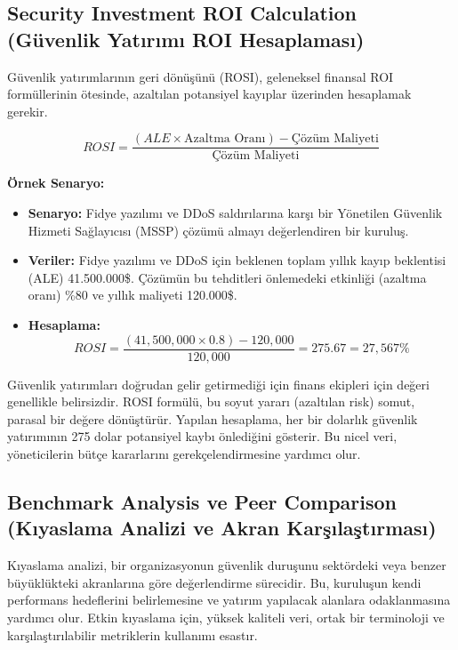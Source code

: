 \subsection{Security Investment ROI Calculation (Güvenlik Yatırımı ROI Hesaplaması)}

Güvenlik yatırımlarının geri dönüşünü (ROSI), geleneksel finansal ROI formüllerinin ötesinde, azaltılan potansiyel kayıplar üzerinden hesaplamak gerekir.

\begin{equation}
ROSI = \frac{(ALE \times \text{Azaltma Oranı}) - \text{Çözüm Maliyeti}}{\text{Çözüm Maliyeti}}
\end{equation}

\textbf{Örnek Senaryo:}
\begin{itemize}
    \item \textbf{Senaryo:} Fidye yazılımı ve DDoS saldırılarına karşı bir Yönetilen Güvenlik Hizmeti Sağlayıcısı (MSSP) çözümü almayı değerlendiren bir kuruluş.
    \item \textbf{Veriler:} Fidye yazılımı ve DDoS için beklenen toplam yıllık kayıp beklentisi (ALE) 41.500.000\$. Çözümün bu tehditleri önlemedeki etkinliği (azaltma oranı) \%80 ve yıllık maliyeti 120.000\$.
    \item \textbf{Hesaplama:}
    \begin{equation*}
    ROSI = \frac{(41,500,000 \times 0.8) - 120,000}{120,000} = 275.67 = 27,567\%
    \end{equation*}
\end{itemize}

Güvenlik yatırımları doğrudan gelir getirmediği için finans ekipleri için değeri genellikle belirsizdir. ROSI formülü, bu soyut yararı (azaltılan risk) somut, parasal bir değere dönüştürür. Yapılan hesaplama, her bir dolarlık güvenlik yatırımının 275 dolar potansiyel kaybı önlediğini gösterir. Bu nicel veri, yöneticilerin bütçe kararlarını gerekçelendirmesine yardımcı olur.

\subsection{Benchmark Analysis ve Peer Comparison (Kıyaslama Analizi ve Akran Karşılaştırması)}

Kıyaslama analizi, bir organizasyonun güvenlik duruşunu sektördeki veya benzer büyüklükteki akranlarına göre değerlendirme sürecidir. Bu, kuruluşun kendi performans hedeflerini belirlemesine ve yatırım yapılacak alanlara odaklanmasına yardımcı olur. Etkin kıyaslama için, yüksek kaliteli veri, ortak bir terminoloji ve karşılaştırılabilir metriklerin kullanımı esastır.

